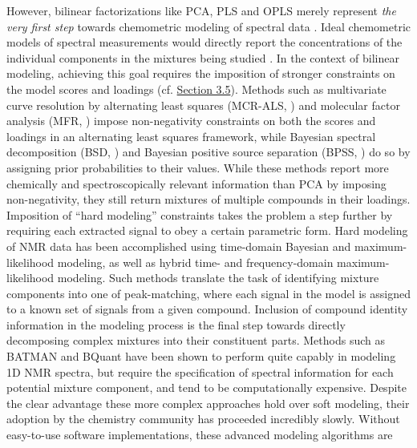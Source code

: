 \begin{doublespace}
However, bilinear factorizations like PCA, PLS and OPLS merely represent
\emph{the very first step} towards chemometric modeling of spectral data
\cite{gromski:aca2015}. Ideal chemometric models of spectral measurements
would directly report the concentrations of the individual components in
the mixtures being studied \cite{eads:anchem2004}. In the context of bilinear
modeling, achieving this goal requires the imposition of stronger constraints
on the model scores and loadings (cf. \hyperlink{section.3.5}{Section 3.5}).
Methods such as multivariate curve resolution by alternating least squares
(MCR-ALS, \cite{dejuan:crac2006}) and molecular factor analysis
(MFR, \cite{eads:anchem2004}) impose non-negativity constraints on both
the scores and loadings in an alternating least squares framework, while
Bayesian spectral decomposition (BSD, \cite{ochs:jmr1999,stoyanova:anchem2004})
and Bayesian positive source separation (BPSS, \cite{moussaoui:ieee2006,
  moussaoui:cils2006}) do so by assigning prior
probabilities to their values. While these methods report more chemically
and spectroscopically relevant information than PCA by imposing non-negativity,
they still return mixtures of multiple compounds in their loadings. Imposition
of ``hard modeling'' constraints takes the problem a step further by requiring
each extracted signal to obey a certain parametric form. Hard modeling of NMR
data has been accomplished using time-domain Bayesian
\cite{bretthorst:jmr1990a,bretthorst:jmr1990b,bretthorst:jmr1990c,
      chylla:jbnmr1993} and maximum-likelihood \cite{chylla:jbnmr1995}
modeling, as well as hybrid time- and frequency-domain maximum-likelihood
\cite{chylla:jbnmr1998,chylla:anchem2011,hu:anchem2011} modeling. Such
methods translate the task of identifying mixture components into one of
peak-matching, where each signal in the model is assigned to a known set
of signals from a given compound. Inclusion of compound identity information
in the modeling process is the final step towards directly decomposing complex
mixtures into their constituent parts. Methods such as BATMAN
\cite{astle:jasa2012,hao:binf2012} and BQuant \cite{zheng:binf2011} have
been shown to perform quite capably in modeling 1D \hnmr{} NMR spectra, but
require the specification of spectral information for each potential mixture
component, and tend to be computationally expensive. Despite the clear
advantage these more complex approaches hold over soft modeling, their
adoption by the chemistry community has proceeded incredibly slowly. Without
easy-to-use software implementations, these advanced modeling algorithms are

\end{doublespace}
